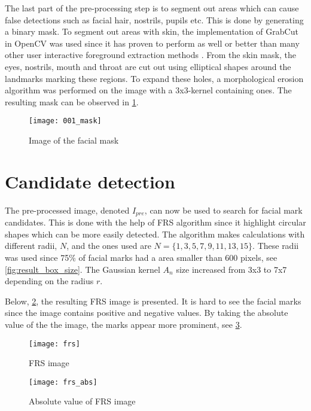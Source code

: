 The last part of the pre-processing step is to segment out areas which can cause false detections such as facial hair, nostrils, pupils etc. This is done by generating a binary mask. To segment out areas with skin, the implementation of GrabCut in OpenCV was used since it has proven to perform as well or better than many other user interactive foreground extraction methods \cite{grabcut}. From the skin mask, the eyes, nostrils, mouth and throat are cut out using elliptical shapes around the landmarks marking these regions. To expand these holes, a morphological erosion algorithm was performed on the image with a 3x3-kernel containing ones. The resulting mask can be observed in \cref{fig:mask_img}. 

\FloatBarrier
\begin{figure}[!h]
	\centering
	\texttt{[image: 001\_mask]}
	\caption{Image of the facial mask \label{fig:mask_img}}
\end{figure}
\FloatBarrier        

\section{Candidate detection}

The pre-processed image, denoted $I_{pre}$, can now be used to search for facial mark candidates. This is done with the help of FRS algorithm since it highlight circular shapes which can be more easily detected. The algorithm makes calculations with different radii, $N$, and the ones used are $N = \{1, 3, 5, 7, 9, 11, 13, 15 \}$. These radii was used since 75\% of facial marks had a area smaller than 600 pixels, see \cref{fig:result_box_size}. The Gaussian kernel $A_n$ size increased from 3x3 to 7x7 depending on the radius $r$. 

Below, \cref{fig:frs}, the resulting FRS image is presented. It is hard to see the facial marks since the image contains positive and negative values. By taking the absolute value of the the image, the marks appear more prominent, see \cref{fig:frs_abs}.  

\FloatBarrier
\begin{figure}[h]
	\centering
	\texttt{[image: frs]}
	\caption{FRS image \label{fig:frs}}
\end{figure}
\FloatBarrier

\FloatBarrier
\begin{figure}[h]
	\centering
	\texttt{[image: frs\_abs]}
	\caption{Absolute value of FRS image \label{fig:frs_abs}}
\end{figure}
\FloatBarrier

